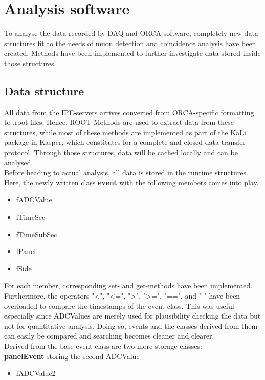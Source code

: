 
\chapter{Analysis software}
\label{ch:Analysis software}
  To analyse the data recorded by DAQ and ORCA software, completely new data structures fit to the needs of muon detection and coincidence analysis have been created. 
  Methods have been implemented to further investigate data stored inside those structures.
  \section{Data structure}
  \label{ch:Analysis software:sec:Data structure}
    All data from the IPE-servers arrives converted from ORCA-specific formatting to .root files. Hence, ROOT Methods are used to extract data from these structures, while most of these methods are implemented as part of the KaLi package in Kasper, which constitutes for a complete and closed data transfer protocol.
    Through those structures, data will be cached locally and can be analysed.\\
    Before heading to actual analysis, all data is stored in the runtime structures.
    Here, the newly written class {\bf event} with the following members comes into play.
    \begin{itemize}
    	\item fADCValue
    	\item fTimeSec
    	\item fTimeSubSec
    	\item fPanel
    	\item fSide
    \end{itemize}
    For each member, corresponding set- and get-methods have been implemented. Furthermore, the operators "<", "<=", ">", ">=", "==", and "-" have been overloaded to compare the timestamps of the event class. This was useful especially since ADCValues are merely used for plausibility checking the data but not for quantitative analysis. Doing so, events and the classes derived from them can easily be compared and searching becomes cleaner and clearer.\\
    Derived from the base event class are two more storage classes:\\
    {\bf panelEvent} storing the second ADCValue
    \begin{itemize}
    	\item fADCValue2
    \end{itemize}
